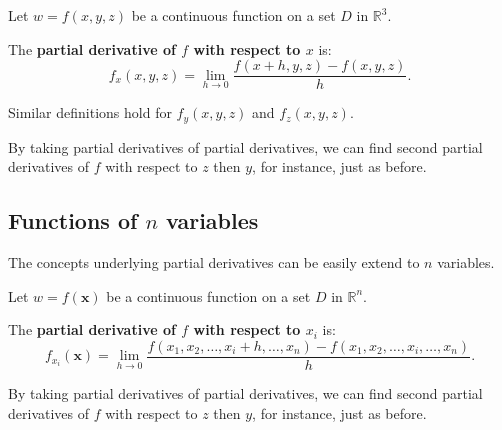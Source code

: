 \begin{definition}\label{def:partial_multiple}
Let $w=f(x,y,z)$ be a continuous function on a set $D$ in $\mathbb{R}^3$. 

The \textbf{partial derivative of $f$ with respect to $x$} is:
	$$f_x(x,y,z) = \lim_{h\to 0} \frac{f(x+h,y,z)-f(x,y,z)}{h}.$$
	
	Similar definitions hold for $f_y(x,y,z)$ and $f_z(x,y,z)$.
\end{definition}

By taking partial derivatives of partial derivatives, we can find second partial derivatives of $f$ with respect to $z$ then $y$, for instance, just as before.

\fi


\ifanalysis
\subsection{Functions of $n$ variables}

The concepts underlying partial derivatives can be easily extend to $n$ variables.

\begin{definition}\label{def:partial_multiple}

Let $w=f(\mathbf{x})$ be a continuous function on a set $D$ in $\mathbb{R}^n$. 

The \textbf{partial derivative of $f$ with respect to $x_i$} is:
	$$f_{x_i}(\mathbf{x}) = \lim_{h\to 0} \frac{f(x_1,x_2,\ldots,x_i+h,\ldots,x_n)-f(x_1,x_2,\ldots,x_i,\ldots,x_n)}{h}.$$
	

\end{definition}


By taking partial derivatives of partial derivatives, we can find second partial derivatives of $f$ with respect to $z$ then $y$, for instance, just as before.

\fi

